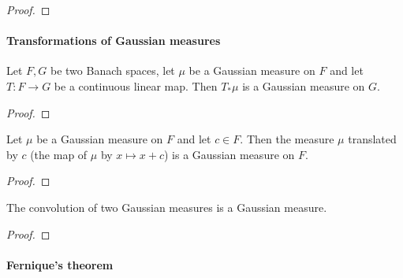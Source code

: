 \begin{proof}\leanok

\end{proof}



\paragraph{Transformations of Gaussian measures}

\begin{lemma}\label{lem:isGaussian_map}
  \mathlibok
Let $F, G$ be two Banach spaces, let $\mu$ be a Gaussian measure on $F$ and let $T : F \to G$ be a continuous linear map.
Then $T_*\mu$ is a Gaussian measure on $G$.
\end{lemma}

\begin{proof}\leanok

\end{proof}


\begin{lemma}\label{lem:isGaussian_add_const}
  \leanok
Let $\mu$ be a Gaussian measure on $F$ and let $c \in F$.
Then the measure $\mu$ translated by $c$ (the map of $\mu$ by $x \mapsto x + c$) is a Gaussian measure on $F$.
\end{lemma}

\begin{proof}\leanok

\end{proof}


\begin{lemma}\label{lem:isGaussian_conv}
  \mathlibok
The convolution of two Gaussian measures is a Gaussian measure.
\end{lemma}

\begin{proof}\leanok

\end{proof}



\paragraph{Fernique's theorem}


